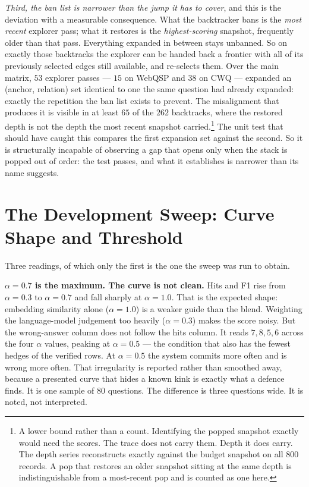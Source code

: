 \emph{Third, the ban list is narrower than the jump it has to cover}, and this
is the deviation with a measurable consequence. What the backtracker bans is the
\emph{most recent} explorer pass; what it restores is the \emph{highest-scoring}
snapshot, frequently older than that pass. Everything expanded in between stays
unbanned. So on exactly those backtracks the explorer can be handed back a
frontier with all of its previously selected edges still available, and
re-selects them. Over the main matrix, $53$ explorer passes --- $15$ on WebQSP
and $38$ on CWQ --- expanded an \textsf{(anchor, relation)} set identical to one
the same question had already expanded: exactly the repetition the ban list
exists to prevent. The misalignment that produces it is visible in at least $65$
of the $262$ backtracks, where the restored depth is not the depth the most
recent snapshot carried.\footnote{A lower bound rather than a count. Identifying
the popped snapshot exactly would need the scores. The trace does not
carry them. Depth it does carry. The depth series reconstructs exactly against
the budget snapshot on all $800$ records. A pop that restores an older snapshot
sitting at the same depth is indistinguishable from a most-recent pop and is
counted as one here.} The unit test that should have caught this compares the
first expansion set against the second. So it is structurally incapable of
observing a gap that opens only when the stack is popped out of order: the test
passes, and what it establishes is narrower than its name suggests.


\section{The Development Sweep: Curve Shape and Threshold}\label{app:sweep}

Three readings, of which only the first is the one the sweep was run to obtain.

\textbf{$\alpha = 0.7$ is the maximum. The curve is not clean.} Hits and F1
rise from $\alpha = 0.3$ to $\alpha = 0.7$ and fall sharply at $\alpha = 1.0$.
That is the expected shape: embedding similarity alone ($\alpha = 1.0$) is a
weaker guide than the blend. Weighting the language-model judgement too
heavily ($\alpha = 0.3$) makes the score noisy. But the wrong-answer column does
not follow the hits column. It reads $7, 8, 5, 6$ across the four $\alpha$
values, peaking at $\alpha = 0.5$ --- the condition that also has the fewest
hedges of the verified rows. At $\alpha = 0.5$ the system commits more often and
is wrong more often. That irregularity is reported rather than smoothed
away, because a presented curve that hides a known kink is exactly what a
defence finds. It is one sample of $80$ questions. The difference is three
questions wide. It is noted, not interpreted.

